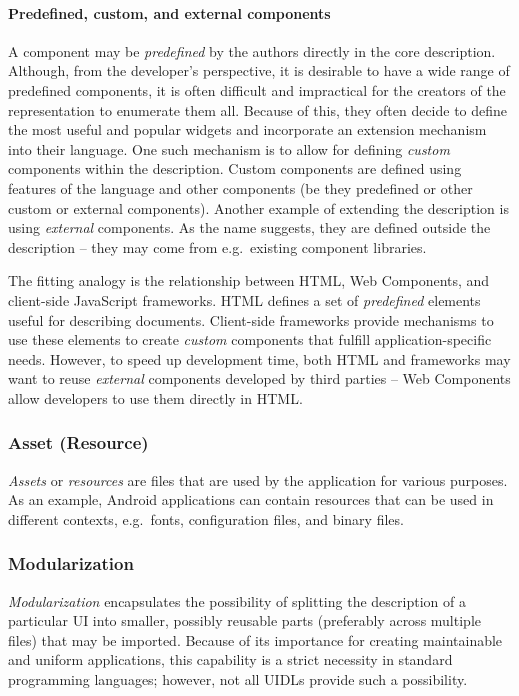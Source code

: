 \paragraph{Predefined, custom, and external components}
A component may be \emph{predefined} by the authors directly in the core description.
Although, from the developer's perspective, it is desirable to have a wide range of predefined components, it is often difficult and impractical for the creators of the representation to enumerate them all.
Because of this, they often decide to define the most useful and popular widgets and incorporate an extension mechanism into their language.
One such mechanism is to allow for defining \emph{custom} components within the description.
Custom components are defined using features of the language and other components (be they predefined or other custom or external components).
Another example of extending the description is using \emph{external} components.
As the name suggests, they are defined outside the description -- they may come from e.g.\ existing component libraries.

The fitting analogy is the relationship between HTML, Web Components, and client-side JavaScript frameworks.
HTML defines a set of \emph{predefined} elements useful for describing documents.
Client-side frameworks provide mechanisms to use these elements to create \emph{custom} components that fulfill application-specific needs.
However, to speed up development time, both HTML and frameworks may want to reuse \emph{external} components developed by third parties -- Web Components allow developers to use them directly in HTML\@.

\subsubsection{Asset (Resource)}
\emph{Assets} or \emph{resources} are files that are used by the application for various purposes.
As an example, Android applications can contain resources that can be used in different contexts, e.g.\ fonts, configuration files, and binary files.

\subsubsection{Modularization}
\emph{Modularization} encapsulates the possibility of splitting the description of a particular UI into smaller, possibly reusable parts (preferably across multiple files) that may be imported.
Because of its importance for creating maintainable and uniform applications, this capability is a strict necessity in standard programming languages;
however, not all UIDLs provide such a possibility.

